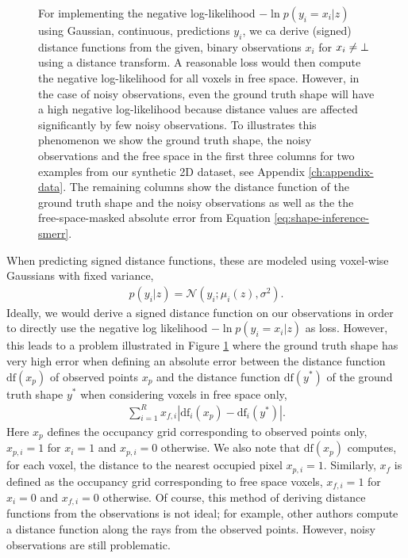 \begin{figure}
  \caption{For implementing the negative log-likelihood $-\ln p(y_i = x_i | z)$
  using Gaussian, \ie continuous, predictions $y_i$, we ca derive (signed) distance
  functions from the given, binary observations $x_i$ for $x_i \neq \bot$ using
  a distance transform.
  A reasonable loss would then
  compute the negative log-likelihood for all voxels in free space.
  However, in the case of noisy observations,
  even the ground truth shape will have a high negative log-likelihood because
  distance values are affected significantly by few noisy observations.
  To illustrates this phenomenon we show the ground truth shape, the noisy
  observations and the free space in the first three columns for two examples
  from our synthetic 2D dataset, see Appendix \ref{ch:appendix-data}. The
  remaining columns show the distance function of the ground truth shape and
  the noisy observations as well as the the free-space-masked absolute error from
  Equation \eqref{eq:shape-inference-smerr}.}
  \label{fig:shape-inference-sdf-problem}
\end{figure}

When predicting signed distance functions, these are modeled using voxel-wise
Gaussians with fixed variance, \ie
\begin{align}
  p(y_i | z) = \mathcal{N}(y_i;\mu_i(z),\sigma^2).
\end{align}
Ideally, we would derive a signed distance function on our observations
in order to directly use the negative log likelihood $-\ln p(y_i = x_i | z)$ as loss. However,
this leads to a problem illustrated in Figure \ref{fig:shape-inference-sdf-problem}
where the ground truth shape has very high error when defining an absolute error between
the distance function $\text{df}(x_p)$ of observed points $x_p$ and the distance function
$\text{df}(y^*)$ of the ground truth shape $y^*$ when considering voxels in free space only, \ie
\begin{align}
  \sum_{i = 1}^R x_{f,i} \left|\text{df}_i(x_p) - \text{df}_i(y^*)\right|.
  \label{eq:shape-inference-smerr}
\end{align}
Here $x_p$ defines the occupancy grid corresponding to observed points only,
\ie $x_{p,i} = 1$ for $x_i = 1$ and $x_{p,i} = 0$ otherwise.
We also note that $\text{df}(x_p)$ computes, for each voxel, the distance
to the nearest occupied pixel $x_{p,i} = 1$. Similarly, $x_f$
is defined as the occupancy grid corresponding to free space voxels,
\ie $x_{f,i} = 1$ for $x_i = 0$ and $x_{f,i} = 0$ otherwise.
Of course, this method of deriving distance functions from the observations
is not ideal; for example, other authors \cite{SteinbrueckerCremers:2013}
compute a distance function along the rays from the observed points. However,
noisy observations are still problematic.%


